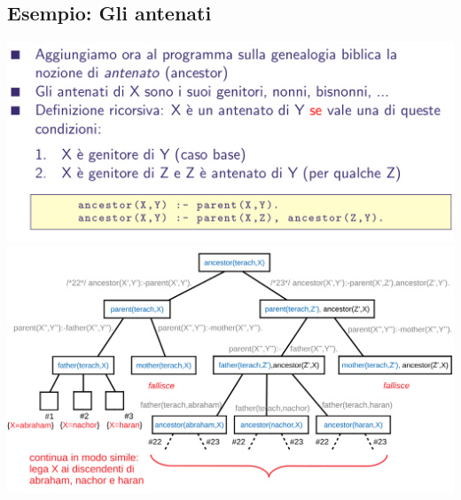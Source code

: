 \documentclass[10pt]{article}
\begin{document}
\subsection{Esempio: Gli antenati}
\includegraphics[scale=0.25]{Immagini/pl29.png}
\\
\includegraphics[scale=0.25]{Immagini/pl30.png}
\end{document}

